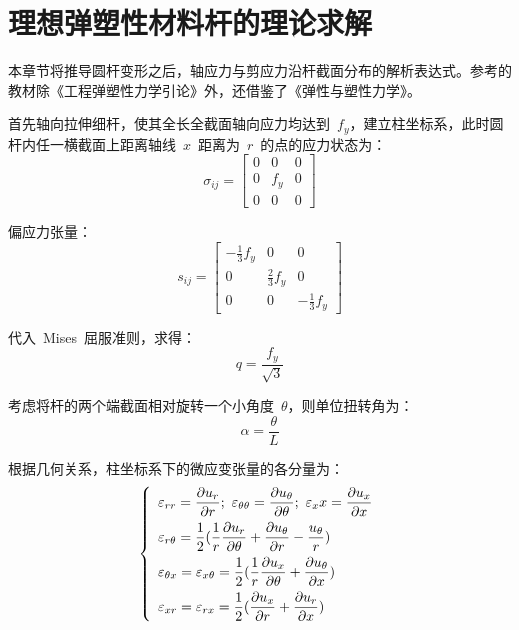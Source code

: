 \chapter{理想弹塑性材料杆的理论求解}
\label{cha:ideal_theory}
本章节将推导圆杆变形之后，轴应力与剪应力沿杆截面分布的解析表达式。参考的教材除《工程弹塑性力学引论》外，还借鉴了《弹性与塑性力学》\cite{txysxlx}。

首先轴向拉伸细杆，使其全长全截面轴向应力均达到~{$f_y$}，建立柱坐标系，此时圆杆内任一横截面上距离轴线~{$x$}~距离为~{$r$}~的点的应力状态为：
\begin{equation}\label{eq4}
    \sigma_{ij} = \begin{bmatrix}
        0 & 0 & 0 \\
        0 & f_y & 0 \\
        0 & 0 & 0
        \end{bmatrix}
\end{equation} 

偏应力张量：
\begin{equation}\label{eq5}
    s_{ij} = \begin{bmatrix}
        -\frac{1}{3}f_y & 0 & 0 \\
        0 & \frac{2}{3}f_y & 0 \\
        0 & 0 & -\frac{1}{3}f_y
        \end{bmatrix}
\end{equation} 

代入~Mises~屈服准则，求得：
\begin{equation}\label{eq6}
    q = \frac{f_y}{\sqrt{3}}
\end{equation} 

考虑将杆的两个端截面相对旋转一个小角度~{$\theta$}，则单位扭转角为：
\begin{equation}\label{eq7}
    \alpha  = \frac{\theta }{L}
\end{equation} 

根据几何关系，柱坐标系下的微应变张量的各分量为：
\begin{equation}\label{eq8}
    \left\{
        \begin{array}{l}
            \varepsilon_{rr} = \dfrac{\partial u_r}{\partial r};~ \varepsilon_{\theta\theta} = \dfrac{\partial u_\theta}{\partial \theta};~ \varepsilon_xx = \dfrac{\partial u_x}{\partial x}\vspace{1ex}\\
            \varepsilon_{r\theta} = \dfrac{1}{2}(\dfrac{1}{r}\dfrac{\partial u_r}{\partial \theta}+\dfrac{\partial u_\theta}{\partial r}-\dfrac{u_\theta}{r})\vspace{1ex}\\
            \varepsilon_{\theta x} = \varepsilon_{x \theta}=\dfrac{1}{2}(\dfrac{1}{r}\dfrac{\partial u_x}{\partial \theta}+\dfrac{\partial u_\theta}{\partial x})\vspace{1ex}\\
            \varepsilon_{xr} = \varepsilon_{rx}=\dfrac{1}{2}(\dfrac{\partial u_x}{\partial r}+\dfrac{\partial u_r}{\partial x})\\
        \end{array}
    \right.
\end{equation} 

